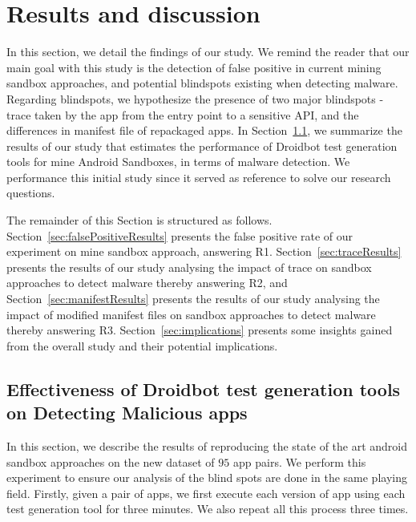 \section{Results and discussion}\label{sec:results}

In this section, we detail the findings of our study.  We remind the reader that our main goal with this study is the detection of false positive in current mining sandbox approaches, and potential blindspots existing when detecting malware. Regarding blindspots, we hypothesize the presence of two major blindspots - trace taken by the app from the entry point to a sensitive API, and the differences in manifest file of repackaged apps. In Section~\ref{sec:testGeneration}, we summarize the results of our study that estimates the performance of Droidbot test generation tools for mine Android Sandboxes, in terms of malware detection. We performance this initial study since it served as reference to solve our research questions. 

The remainder of this Section is structured as follows. Section~\ref{sec:falsePositiveResults} presents the false positive rate of our experiment on mine sandbox approach, answering R1. Section~\ref{sec:traceResults} presents the results of our study analysing the impact of trace on sandbox approaches to detect malware thereby answering R2, and Section~\ref{sec:manifestResults} presents the results of our study analysing the impact of modified manifest files on sandbox approaches to detect malware thereby answering R3. Section~\ref{sec:implications} presents some insights gained from the overall study and their potential implications.

\subsection{Effectiveness of Droidbot test generation tools on Detecting Malicious apps}\label{sec:testGeneration}


In this section, we describe the results of reproducing the state of the art android sandbox approaches on the new dataset of $95$ app pairs. We perform this experiment to ensure our analysis of the blind spots are done in the same playing field. Firstly, given a pair of apps, we first execute each version of app using each test generation tool for three minutes. We also repeat all this process three times. 

